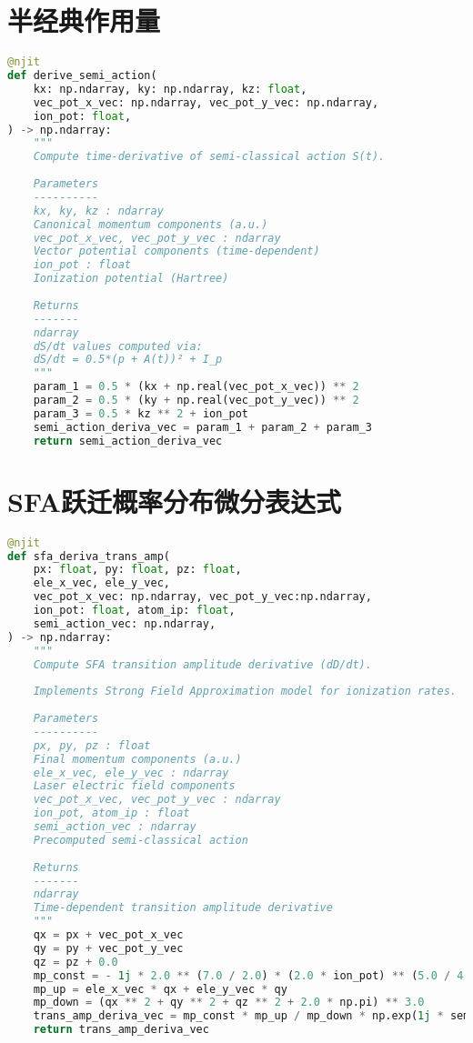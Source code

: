 \section{半经典作用量}\label{app:semi_action}
\begin{lstlisting}[language=Python, caption={半经典作用量}, label={code:semi-action}]
@njit
def derive_semi_action(
	kx: np.ndarray, ky: np.ndarray, kz: float,
	vec_pot_x_vec: np.ndarray, vec_pot_y_vec: np.ndarray,
	ion_pot: float,
) -> np.ndarray:
    """
	Compute time-derivative of semi-classical action S(t).
	
	Parameters
	----------
	kx, ky, kz : ndarray
	Canonical momentum components (a.u.)
	vec_pot_x_vec, vec_pot_y_vec : ndarray
	Vector potential components (time-dependent)
	ion_pot : float
	Ionization potential (Hartree)
	
	Returns
	-------
	ndarray
	dS/dt values computed via:
	dS/dt = 0.5*(p + A(t))² + I_p
	"""
	param_1 = 0.5 * (kx + np.real(vec_pot_x_vec)) ** 2
	param_2 = 0.5 * (ky + np.real(vec_pot_y_vec)) ** 2
	param_3 = 0.5 * kz ** 2 + ion_pot
	semi_action_deriva_vec = param_1 + param_2 + param_3
	return semi_action_deriva_vec
\end{lstlisting}

\section{SFA跃迁概率分布微分表达式}\label{app:sfa_trans_amp}
\begin{lstlisting}[language=Python, caption={SFA跃迁概率分布微分表达式}, label={code:sfa-trans-amp}]
@njit
def sfa_deriva_trans_amp(
	px: float, py: float, pz: float,
	ele_x_vec, ele_y_vec,
	vec_pot_x_vec: np.ndarray, vec_pot_y_vec:np.ndarray,
	ion_pot: float, atom_ip: float,
	semi_action_vec: np.ndarray,
) -> np.ndarray:
    """
	Compute SFA transition amplitude derivative (dD/dt).
	
	Implements Strong Field Approximation model for ionization rates.
	
	Parameters
	----------
	px, py, pz : float
	Final momentum components (a.u.)
	ele_x_vec, ele_y_vec : ndarray
	Laser electric field components
	vec_pot_x_vec, vec_pot_y_vec : ndarray
	ion_pot, atom_ip : float
	semi_action_vec : ndarray
	Precomputed semi-classical action
	
	Returns
	-------
	ndarray
	Time-dependent transition amplitude derivative
	"""
	qx = px + vec_pot_x_vec
	qy = py + vec_pot_y_vec
	qz = pz + 0.0
	mp_const = - 1j * 2.0 ** (7.0 / 2.0) * (2.0 * ion_pot) ** (5.0 / 4.0) / np.pi
	mp_up = ele_x_vec * qx + ele_y_vec * qy
	mp_down = (qx ** 2 + qy ** 2 + qz ** 2 + 2.0 * np.pi) ** 3.0
	trans_amp_deriva_vec = mp_const * mp_up / mp_down * np.exp(1j * semi_action_vec)
	return trans_amp_deriva_vec
\end{lstlisting}

